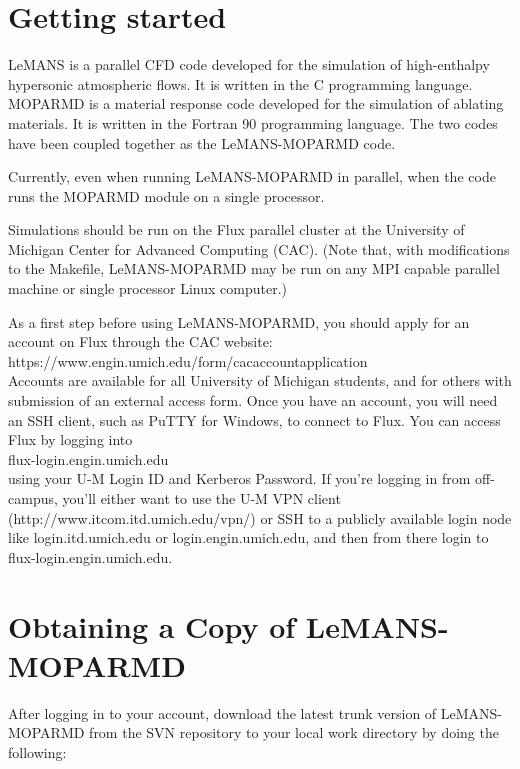 \documentclass[]{article}
\begin{document}
\section{Getting started}

LeMANS is a parallel CFD code developed for the simulation of high-enthalpy hypersonic atmospheric flows. It is written in the C programming language.  MOPARMD is a material response code developed for the simulation of ablating materials.  It is written in the Fortran 90 programming language.  The two codes have been coupled together as the LeMANS-MOPARMD code.

Currently, even when running LeMANS-MOPARMD in parallel, when the code runs the MOPARMD module on a single processor.

Simulations should be run on the Flux parallel cluster at the University of Michigan Center for Advanced Computing (CAC). (Note that, with modifications to the Makefile, LeMANS-MOPARMD may be run on any MPI capable parallel machine or single processor Linux computer.)

As a first step before using LeMANS-MOPARMD, you should apply for an account on Flux through the CAC website:\\

https://www.engin.umich.edu/form/cacaccountapplication\\

Accounts are available for all University of Michigan students, and for others with submission of an external access form.
Once you have an account, you will need an SSH client, such as PuTTY for Windows, to connect to Flux. You can access Flux by logging into \\

flux-login.engin.umich.edu \\

\noindent using your U-M Login ID and Kerberos Password. If you're logging in from off-campus, you'll either want to use the U-M VPN client (http://www.itcom.itd.umich.edu/vpn/) or SSH to a publicly available login node like login.itd.umich.edu or login.engin.umich.edu, and then from there login to flux-login.engin.umich.edu.

\section{Obtaining a Copy of LeMANS-MOPARMD}

After logging in to your account, download the latest trunk version of  LeMANS-MOPARMD from the SVN repository to your local work directory by doing the following:
\end{document}
